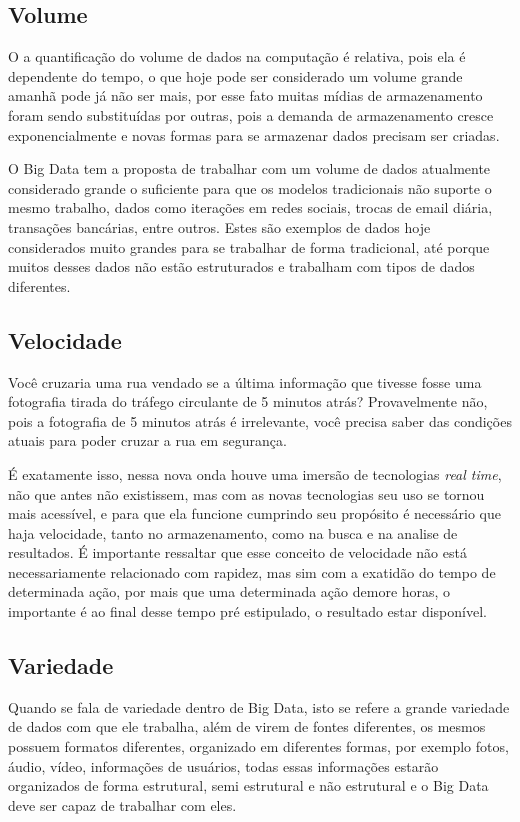 \subsection{Volume}
\label{subsec:volume}
O a quantificação do volume de dados na computação é relativa, pois ela é dependente do tempo, o que hoje pode ser considerado um volume grande amanhã pode já não ser mais, por esse fato muitas mídias de armazenamento foram sendo substituídas por outras, pois a demanda de armazenamento cresce exponencialmente e novas formas para se armazenar dados precisam ser criadas.~\cite{forbes} 

O Big Data tem a proposta de trabalhar com um volume de dados atualmente considerado grande o suficiente para que os modelos tradicionais não suporte o mesmo trabalho, dados como iterações em redes sociais, trocas de email diária, transações bancárias, entre outros. Estes são exemplos de dados hoje considerados muito grandes para se trabalhar de forma tradicional, até porque muitos desses dados não estão estruturados e trabalham com tipos de dados diferentes.~\cite{forbes}  

\subsection{Velocidade}
\label{subsec:velocidade}
\begin{citacao}
Você cruzaria uma rua vendado se a última informação que tivesse fosse uma fotografia tirada do tráfego circulante de 5 minutos atrás? Provavelmente não, pois a fotografia de 5 minutos atrás é irrelevante, você precisa saber das condições atuais para poder cruzar a rua em segurança.~\cite[p. 2]{forbes} 
\end{citacao}

É exatamente isso, nessa nova onda houve uma imersão de tecnologias \textit{real time}, não que antes não existissem, mas com as novas tecnologias seu uso se tornou mais acessível, e para que ela funcione cumprindo seu propósito é necessário que haja velocidade, tanto no armazenamento, como na busca e na analise de resultados. É importante ressaltar que esse conceito de velocidade não está necessariamente relacionado com rapidez, mas sim com a exatidão do tempo de determinada ação, por mais que uma determinada ação demore horas, o importante é ao final desse tempo pré estipulado, o resultado estar disponível.~\cite{forbes} 

\subsection{Variedade}
\label{subsec:variedade}
Quando se fala de variedade dentro de Big Data, isto se refere a grande variedade de dados com que ele trabalha, além de virem de fontes diferentes, os mesmos possuem formatos diferentes, organizado em diferentes formas, por exemplo fotos, áudio, vídeo, informações de usuários, todas essas informações estarão organizados de forma estrutural, semi estrutural e não estrutural e o Big Data deve ser capaz de trabalhar com eles.


